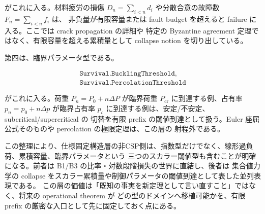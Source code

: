 \documentclass[12pt,a4paper]{article}
\begin{document}
がこれに入る。材料疲労の損傷 \(D_{n}=\sum_{i<n}d_{i}\) や分散合意の故障数 \(F_{n}=\sum_{i<n}f_{i}\) は、 非負量が有限容量または fault budget を超えると failure に入る。ここでは crack propagation の詳細や 特定の Byzantine agreement 定理ではなく、有限容量を超える累積量として collapse notion を切り出している。

第四は、臨界パラメータ型である。

\[
\begin{aligned}
\texttt{Survival.BucklingThreshold},\quad \\
\texttt{Survival.PercolationThreshold}
\end{aligned}
\]

がこれに入る。荷重 \(P_{n}=P_0+n\Delta P\) が臨界荷重 \(P_{\mathrm{cr}}\) に到達する例、占有率 \(p_{n}=p_0+n\Delta p\) が臨界占有率 \(p_{c}\) に到達する例は、安定/不安定、subcritical/supercritical の 切替を有限 prefix の閾値到達として扱う。Euler 座屈公式そのものや percolation の極限定理は、この層の 射程外である。

この整理により、仕様固定構造層の非CSP側は、指数型だけでなく、線形過負荷、累積容量、臨界パラメータという 三つのスカラー閾値型も含むことが明確になる。前者は B1/B3 の比率・対数段階損失の世界に直結し、後者は 集合値力学の collapse をスカラー累積量や制御パラメータの閾値到達として表した並列表現である。 この層の価値は「既知の事実を新定理として言い直すこと」ではなく、将来の operational theorem が どの型のドメインへ移植可能かを、有限 prefix の厳密な入口として先に固定しておく点にある。
\end{document}
